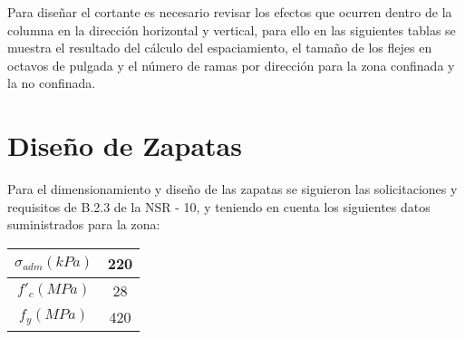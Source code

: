 \documentclass[12pt]{article}
\begin{document}
Para diseñar el cortante es necesario revisar los efectos que ocurren dentro de la columna en la dirección horizontal y vertical, para ello en las siguientes tablas se muestra el resultado del cálculo del espaciamiento, el tamaño de los flejes en octavos de pulgada y el número de ramas por dirección para la zona confinada y la no confinada.





\section{Diseño de Zapatas}
Para el dimensionamiento y diseño de las zapatas se siguieron las solicitaciones y requisitos de B.2.3 de la NSR - 10, y teniendo en cuenta los siguientes datos suministrados para la zona:\\
\begin{table}[H]
  \centering
    \begin{tabular}{|c|c|}
    \hline
    \textbf {$\sigma_{adm}   (kPa)$} & 220 \bigstrut\\
    \hline
    \textbf{$f'_{c}   (MPa)$} & 28 \bigstrut\\
    \hline
    \textbf{$f_{y}   (MPa)$} & 420 \bigstrut\\
    \hline
    \end{tabular}%
  \label{tab:addlabel}%
\end{table}%
\end{document}
